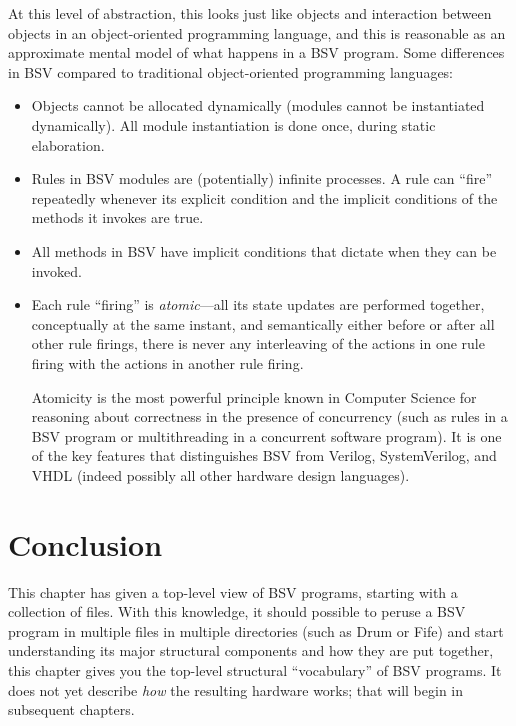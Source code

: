 At this level of abstraction, this looks just like objects and
interaction between objects in an object-oriented programming
language, and this is reasonable as an approximate mental model of
what happens in a BSV program.  Some differences in BSV compared to
traditional object-oriented programming languages:

\begin{itemize}

 \item Objects cannot be allocated dynamically (modules cannot be
       instantiated dynamically).  All module instantiation is done
       once, during static elaboration.

 \item Rules in BSV modules are (potentially) infinite processes.  A
       rule can ``fire'' repeatedly whenever its explicit condition
       and the implicit conditions of the methods it invokes are true.

 \item All methods in BSV have implicit conditions that dictate when
       they can be invoked.

 \item Each rule ``firing'' is \emph{atomic}---all its state updates
       are performed together, conceptually at the same instant, and
       semantically either before or after all other rule firings,
       {\ie} there is never any interleaving of the actions in one
       rule firing with the actions in another rule firing.

       Atomicity is the most powerful principle known in Computer
       Science for reasoning about correctness in the presence of
       concurrency (such as rules in a BSV program or multithreading
       in a concurrent software program).  It is one of the key
       features that distinguishes BSV from Verilog, SystemVerilog,
       and VHDL (indeed possibly all other hardware design languages).

\end{itemize}


\section{Conclusion}

This chapter has given a top-level view of BSV programs, starting with
a collection of files.  With this knowledge, it should possible to
peruse a BSV program in multiple files in multiple directories (such
as Drum or Fife) and start understanding its major structural
components and how they are put together, {\ie} this chapter gives you
the top-level structural ``vocabulary'' of BSV programs.  It does not
yet describe \emph{how} the resulting hardware works; that will begin
in subsequent chapters.

